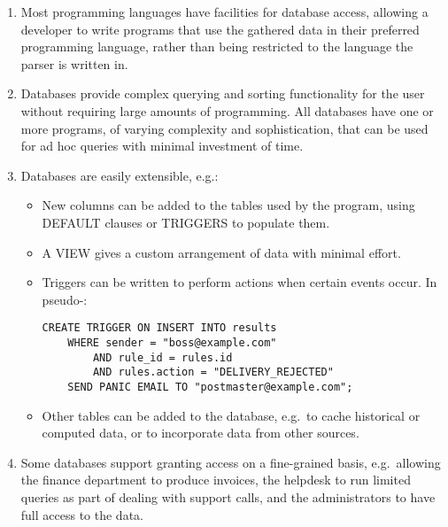 \begin{enumerate}

    \item Most programming languages have facilities for database access,
        allowing a developer to write programs that use the gathered data
        in their preferred programming language, rather than being
        restricted to the language the parser is written in.

    \item Databases provide complex querying and sorting functionality for
        the user without requiring large amounts of programming.  All
        databases have one or more programs, of varying complexity and
        sophistication, that can be used for ad hoc queries with minimal
        investment of time.

    \item Databases are easily extensible, e.g.:

        \begin{itemize}

            \item New columns can be added to the tables used by the
                program, using DEFAULT clauses or TRIGGERS to populate
                them.

            \item A VIEW gives a custom arrangement of data with minimal
                effort.

            \item Triggers can be written to perform actions when certain
                events occur.  In pseudo-\@:

\begin{verbatim}
CREATE TRIGGER ON INSERT INTO results
    WHERE sender = "boss@example.com"
        AND rule_id = rules.id
        AND rules.action = "DELIVERY_REJECTED"
    SEND PANIC EMAIL TO "postmaster@example.com";
\end{verbatim}

            \item Other tables can be added to the database, e.g.\ to cache
                historical or computed data, or to incorporate data from
                other sources.

        \end{itemize}

    \item Some databases support granting access on a fine-grained basis,
        e.g.\ allowing the finance department to produce invoices, the
        helpdesk to run limited queries as part of dealing with support
        calls, and the administrators to have full access to the data.



\end{enumerate}
